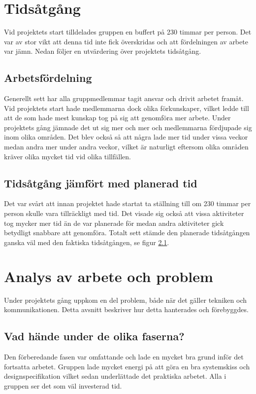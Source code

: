 \documentclass[11pt]{article}
\begin{document}
\pagebreak
{}

\section{Tidsåtgång}
Vid projektets start tilldelades gruppen en buffert på 230 timmar per person. Det var av stor vikt att denna tid inte fick överskridas och att fördelningen av arbete var jämn. Nedan följer en utvärdering över projektets tidsåtgång.

\subsection{Arbetsfördelning}
Generellt sett har alla gruppmedlemmar tagit ansvar och drivit arbetet framåt. Vid projektets start hade medlemmarna dock olika förkunskaper, vilket ledde till att de som hade mest kunskap tog på sig att genomföra mer arbete. Under projektets gång jämnade det ut sig mer och mer och medlemmarna fördjupade sig inom olika områden. Det blev också så att några lade mer tid under vissa veckor medan andra mer under andra veckor, vilket är naturligt eftersom olika områden kräver olika mycket tid vid olika tillfällen.

\subsection{Tidsåtgång jämfört med planerad tid}
Det var svårt att innan projektet hade startat ta ställning till om 230 timmar per person skulle vara tillräckligt med tid. Det visade sig också att vissa aktiviteter tog mycker mer tid än de var planerade för medan andra aktiviteter gick betydligt snabbare att genomföra. Totalt sett stämde den planerade tidsåtgången ganska väl med den faktiska tidsåtgången, se figur \ref{}.

\section{Analys av arbete och problem}
Under projektets gång uppkom en del problem, både när det gäller tekniken och kommunikationen. Detta avsnitt beskriver hur detta hanterades och förebyggdes. 

\subsection{Vad hände under de olika faserna?}
Den förberedande fasen var omfattande och lade en mycket bra grund inför det fortsatta arbetet. Gruppen lade mycket energi på att göra en bra systemskiss och designspecifikation vilket sedan underlättade det praktiska arbetet. Alla i gruppen ser det som väl investerad tid.
\end{document}
